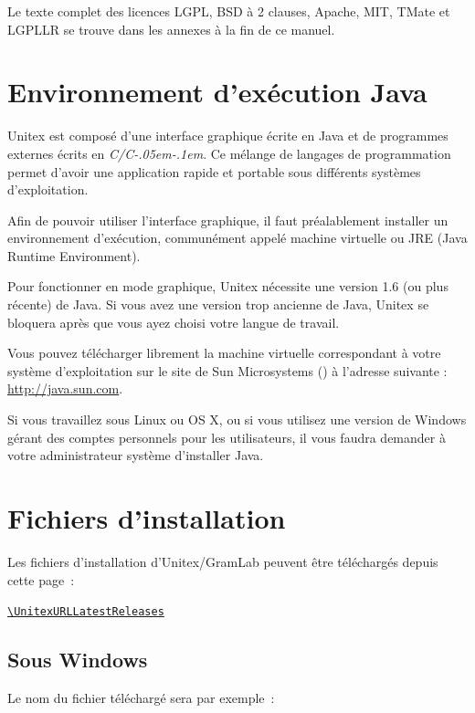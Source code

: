 \bigskip
\noindent Le texte complet des licences LGPL, BSD à 2 clauses, Apache, MIT, TMate et LGPLLR
se trouve dans les annexes à la fin de ce manuel.

\section{Environnement d’exécution Java}
Unitex est composé d’une interface graphique écrite en Java et de programmes externes
écrits en \textit{C/C\kern-.05em\raisebox{.5ex}{++}\kern-.1em}. Ce mélange de langages de 
programmation permet d’avoir une application rapide et portable sous différents systèmes d’exploitation.


\bigskip
\noindent Afin de pouvoir utiliser l’interface graphique, il faut préalablement installer
un environnement d’exécution, communément appelé machine virtuelle  ou
JRE (Java Runtime Environment).

\bigskip
\noindent Pour fonctionner en mode graphique, Unitex nécessite une version 1.6 (ou plus récente)
de Java. Si vous avez une version trop ancienne de Java, Unitex se bloquera après que vous
ayez choisi votre langue de travail.


\bigskip
\noindent Vous pouvez télécharger librement la machine virtuelle correspondant à votre 
système d’exploitation sur le site de Sun Microsystems (\cite{site-java}) à l’adresse suivante : 
\url{http://java.sun.com}.

\bigskip
\noindent Si vous travaillez sous Linux ou OS X, ou si vous
utilisez une version de Windows gérant des comptes personnels pour les utilisateurs, il vous
faudra demander à votre administrateur système d’installer Java.


\section{Fichiers d'installation}
\begin{samepage}
Les fichiers d'installation d'Unitex/GramLab peuvent être téléchargés depuis cette page~:

\begin{center}
{\tt\url{\UnitexURLLatestReleases}}
\end{center}
\end{samepage}

\subsection{Sous Windows}
Le nom du fichier téléchargé sera par exemple~:

